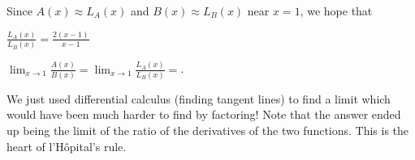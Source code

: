 \documentclass{ximera}
\begin{document}
\begin{question}
Since $A(x) \approx L_A(x)$  and $B(x) \approx L_B(x)$ near $x=1$, we hope that 
\begin{hint}
  $\frac{L_A(x)}{L_B(x)}  = \frac{2(x-1)}{x-1}$
\end{hint}
$\displaystyle \lim_{x \to 1} \frac{A(x)}{B(x)} = \displaystyle \lim_{x \to 1} \frac{L_A(x)}{L_B(x)}=$.
\end{question}

We just used differential calculus (finding tangent lines) to find a limit which would have been much harder to find
by factoring!  Note that the answer ended up being the limit of the ratio of the derivatives of the two functions.  
This is the heart of l'H\^opital's rule.
\end{document}
